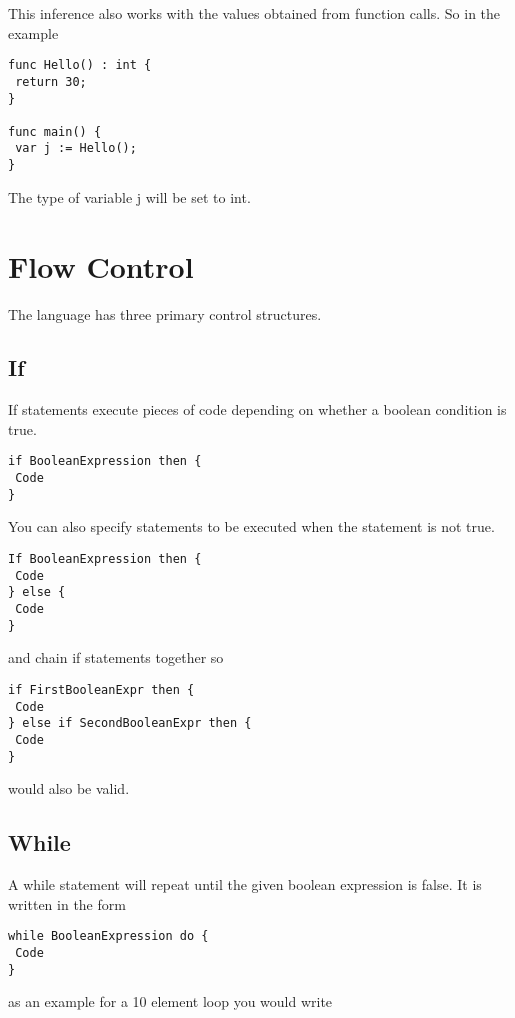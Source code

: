 \documentclass[]{final_report}
\begin{document}
This inference also works with the values obtained from function calls. So in the example

\begin{verbatim}
func Hello() : int {
 return 30;
}

func main() {
 var j := Hello();
}
\end{verbatim}

The type of variable j will be set to int.

\section{Flow Control}

The language has three primary control structures.

\subsection{If}

If statements execute pieces of code depending on whether a boolean condition is true.

\begin{verbatim}
if BooleanExpression then {
 Code
}
\end{verbatim}

You can also specify statements to be executed when the statement is not true.

\begin{verbatim}
If BooleanExpression then {
 Code
} else {
 Code 
}
\end{verbatim}

and chain if statements together so

\begin{verbatim}
if FirstBooleanExpr then {
 Code
} else if SecondBooleanExpr then {
 Code
}
\end{verbatim}

would also be valid.

\subsection{While}

A while statement will repeat until the given boolean expression is false. It is written in the form

\begin{verbatim}
while BooleanExpression do {
 Code
}
\end{verbatim}

as an example for a 10 element loop you would write
\end{document}
